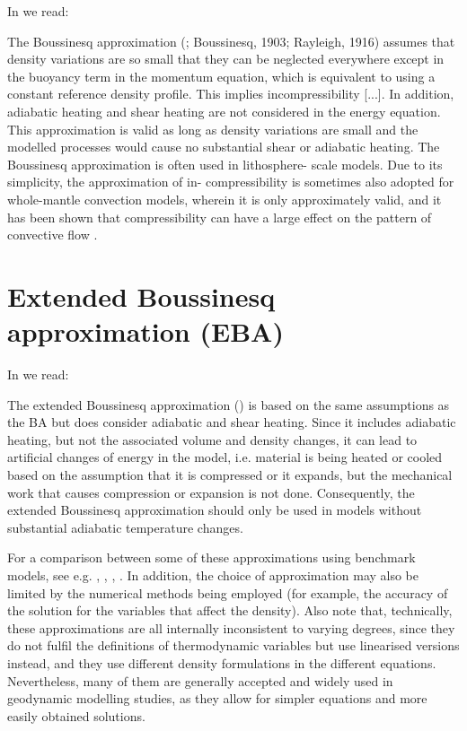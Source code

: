 \documentclass[a4paper]{article}
\begin{document}
In \textcite{vacp22} we read: 
\begin{displayquote}
The Boussinesq approximation (\textcite{ober79}; Boussinesq, 1903; Rayleigh, 1916) 
assumes that density
variations are so small that they can be neglected everywhere
except in the buoyancy term in the momentum equation, 
which is equivalent to using a constant reference density profile. 
This implies incompressibility [...]. In addition, adiabatic heating
and shear heating are not considered in the energy equation. 
This approximation is valid as long as density variations are small 
and the modelled processes would cause no substantial 
shear or adiabatic heating.
The Boussinesq approximation is often used in lithosphere-
scale models. Due to its simplicity, the approximation of in-
compressibility is sometimes also adopted for whole-mantle
convection models, wherein it is only approximately valid,
and it has been shown that compressibility can have a large
effect on the pattern of convective flow \cite{tack96}.
\end{displayquote}





\newpage
\section{Extended Boussinesq approximation (EBA)}

In \textcite{vacp22} we read: 
\begin{displayquote}
The extended Boussinesq approximation (\cite{chyu85,oxtu78}) is based
on the same assumptions as the BA but does consider adiabatic 
and shear heating. Since it includes adiabatic heating,
but not the associated volume and density changes, it can
lead to artificial changes of energy in the model, i.e. material 
is being heated or cooled based on the assumption that
it is compressed or it expands, but the mechanical work that
causes compression or expansion is not done. Consequently,
the extended Boussinesq approximation should only be used
in models without substantial adiabatic temperature changes.

For a comparison between some of these approximations
using benchmark models, see e.g. \textcite{sthe89},
\textcite{lezh08}, \textcite{kilv10}, \textcite{gadb20}. 
In addition, the choice of approximation may
also be limited by the numerical methods being employed
(for example, the accuracy of the solution for the variables
that affect the density). Also note that, technically, these 
approximations are all internally inconsistent to varying 
degrees, since they do not fulfil the definitions of
thermodynamic variables but use linearised versions instead,
and they use different density formulations in the different 
equations. Nevertheless, many of them are generally accepted 
and widely used in geodynamic modelling studies, as
they allow for simpler equations and more easily obtained solutions.
\end{displayquote}








\newpage
\printbibliography
\end{document}
